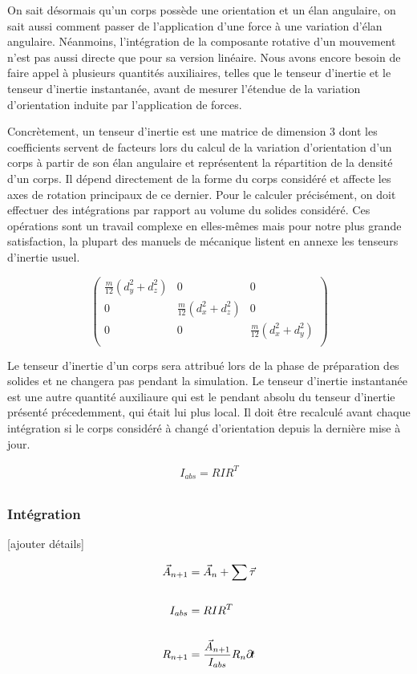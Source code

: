 On sait désormais qu'un corps possède une orientation et un élan
angulaire, on sait aussi comment passer de l'application d'une force à
une variation d'élan angulaire. Néanmoins, l'intégration de la
composante rotative d'un mouvement n'est pas aussi directe que pour sa
version linéaire. Nous avons encore besoin de faire appel à plusieurs
quantités auxiliaires, telles que le tenseur d'inertie et le tenseur
d'inertie instantanée, avant de mesurer l'étendue de la variation
d'orientation induite par l'application de forces.

Concrètement, un tenseur d'inertie est une matrice de dimension 3 dont
les coefficients servent de facteurs lors du calcul de la variation
d'orientation d'un corps à partir de son élan angulaire et
représentent la répartition de la densité d'un corps. Il dépend
directement de la forme du corps considéré et affecte les axes de
rotation principaux de ce dernier. Pour le calculer précisément, on
doit effectuer des intégrations par rapport au volume du solides
considéré. Ces opérations sont un travail complexe en elles-mêmes mais
pour notre plus grande satisfaction, la plupart des manuels de
mécanique listent en annexe les tenseurs d'inertie usuel.

\[
\begin{pmatrix}
  \frac{m}{12}(d_y^2 + d_z^2) & 0 & 0 \\
  0 & \frac{m}{12}(d_x^2 + d_z^2) & 0 \\
  0 & 0 & \frac{m}{12}(d_x^2 + d_y^2) \\
\end{pmatrix}
\]

Le tenseur d'inertie d'un corps sera attribué lors de la phase de
préparation des solides et ne changera pas pendant la simulation. Le
tenseur d'inertie instantanée est une autre quantité auxiliaure qui
est le pendant absolu du tenseur d'inertie présenté précedemment, qui
était lui plus local. Il doit être recalculé avant chaque intégration
si le corps considéré à changé d'orientation depuis la dernière mise à
jour.

\begin{align*}
  I_{abs} = R I R^T \\
\end{align*}

\subsubsection{Intégration}

[ajouter détails]

\begin{align*}
  \vec{A}_{n+1} &= \vec{A}_n + \sum \vec{\tau} \\ \\
  I_{abs} &= R I R^T \\ \\
  R_{n+1} &= \frac{\vec{A}_{n+1}}{I_{abs}} R_n \partial \! t \\
\end{align*}
